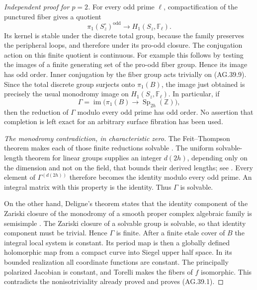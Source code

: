 \begin{proof}[Independent proof for \(p=2\)]
For every odd prime \(\ell\), compactification of the punctured
fiber gives a quotient
\[
 \pi_1(S_z^\circ)^{\mathrm{odd}}\longrightarrow
                          H_1(S_z,\mathbb F_\ell).
                                                               \tag{AG.39.9}
\]
Its kernel is stable under the discrete total group, because the
family preserves the peripheral loops, and therefore under its
pro-odd closure. The conjugation action on this finite quotient
is continuous. For example this follows by testing the images
of a finite generating set of the pro-odd fiber group. Hence its
image has odd order. Inner conjugation by the fiber group acts
trivially on (AG.39.9). Since the total discrete group surjects
onto \(\pi_1(B)\), the image just obtained is precisely the
usual monodromy image on \(H_1(S_z,\mathbb F_\ell)\).
In particular, if
\[
 \Gamma=\operatorname{im}\bigl(\pi_1(B)\to
                    \operatorname{Sp}_{2h}(\mathbb Z)\bigr),
\]
then the reduction of \(\Gamma\) modulo every odd prime has
odd order. No assertion that completion is left exact for an
arbitrary surface fibration has been used.

\emph{The monodromy contradiction, in characteristic zero.}
The Feit--Thompson theorem makes each of those finite reductions
solvable \cite{AC_FeitThompson1963}. The uniform solvable-length
theorem for linear groups supplies an integer \(d(2h)\),
depending only on the dimension and not on the field, that
bounds their derived lengths; see
\cite[Section 1, printed p. 59]{AG_Newman1972}.
Every element of \(\Gamma^{(d(2h))}\) therefore becomes the
identity modulo every odd prime. An integral matrix with this
property is the identity. Thus \(\Gamma\) is solvable.

On the other hand, Deligne's theorem states that the identity
component of the Zariski closure of the monodromy of a smooth
proper complex algebraic family is semisimple
\cite[Corollary 4.2.9(a)]{AG_Deligne1971}.
The Zariski closure of a solvable group is solvable, so that
identity component must be trivial. Hence \(\Gamma\) is finite.
After a finite etale cover of \(B\) the integral local system
is constant. Its period map is then a globally defined
holomorphic map from a compact curve into Siegel upper half
space. In its bounded realization all coordinate functions are
constant. The principally polarized Jacobian is constant, and
Torelli makes the fibers of \(f\) isomorphic. This contradicts
the nonisotriviality already proved and proves (AG.39.1).


\end{proof}
